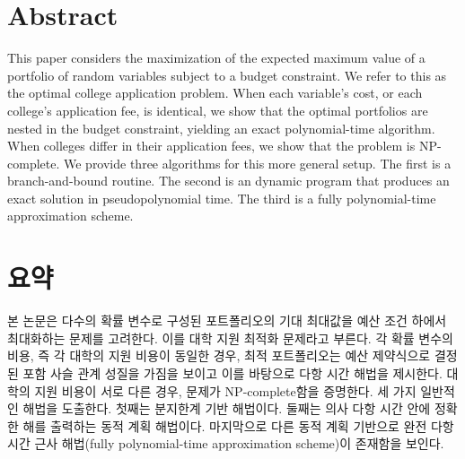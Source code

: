 \documentclass[11pt]{article} %
\author{Max Kapur}
\date{\today}                %
\theoremstyle{definition}
\theoremstyle{definition}
\begin{document}
\maketitle

\section*{Abstract}
This paper considers the maximization of the expected maximum value of a portfolio of random variables subject to a budget constraint. We refer to this as the optimal college application problem. When each variable's cost, or each college's application fee, is identical, we show that the optimal portfolios are nested in the budget constraint, yielding an exact polynomial-time algorithm. When colleges differ in their application fees, we show that the problem is NP-complete. We provide three algorithms for this more general setup. The first is a branch-and-bound routine. The second is an dynamic program that produces an exact solution in pseudopolynomial time. The third is a fully polynomial-time approximation scheme. 

\section*{요약}
본 논문은 다수의 확률 변수로 구성된 포트폴리오의 기대 최대값을 예산 조건 하에서 최대화하는 문제를 고려한다. 이를 대학 지원 최적화 문제라고 부른다. 각 확률 변수의 비용, 즉 각 대학의 지원 비용이 동일한 경우, 최적 포트폴리오는 예산 제약식으로 결정된 포함 사슬 관계 성질을 가짐을 보이고 이를 바탕으로 다항 시간 해법을 제시한다. 대학의 지원 비용이 서로 다른 경우, 문제가 NP-complete함을 증명한다. 세 가지 일반적인 해법을 도출한다. 첫째는 분지한계 기반 해법이다. 둘째는 의사 다항 시간 안에 정확한 해를 출력하는 동적 계획 해법이다. 마지막으로 다른 동적 계획 기반으로 완전 다항 시간 근사 해법(fully polynomial-time approximation scheme)이 존재함을 보인다.

\pagebreak

\tableofcontents
\end{document}
